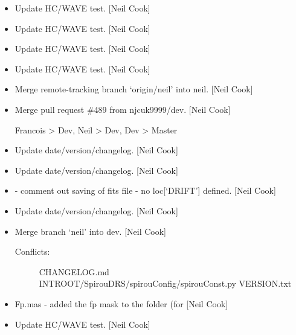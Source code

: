\documentclass[a4paper,10pt,english]{report}
\begin{document}
\begin{itemize}
\item {} 
Update HC/WAVE test. {[}Neil Cook{]}

\item {} 
Update HC/WAVE test. {[}Neil Cook{]}

\item {} 
Update HC/WAVE test. {[}Neil Cook{]}

\item {} 
Update HC/WAVE test. {[}Neil Cook{]}

\item {} 
Merge remote-tracking branch ‘origin/neil’ into neil. {[}Neil Cook{]}

\item {} 
Merge pull request \#489 from njcuk9999/dev. {[}Neil Cook{]}

Francois \textendash{}\textgreater{} Dev, Neil \textendash{}\textgreater{} Dev, Dev \textendash{}\textgreater{} Master

\item {} 
Update date/version/changelog. {[}Neil Cook{]}

\item {} 
Update date/version/changelog. {[}Neil Cook{]}

\item {} 
 - comment out saving of fits file - no
loc{[}‘DRIFT’{]} defined. {[}Neil Cook{]}

\item {} 
Update date/version/changelog. {[}Neil Cook{]}

\item {} 
Merge branch ‘neil’ into dev. {[}Neil Cook{]}
\begin{description}
\item[{Conflicts:}] \leavevmode
CHANGELOG.md
INTROOT/SpirouDRS/spirouConfig/spirouConst.py
VERSION.txt

\end{description}

\item {} 
Fp.mas - added the fp mask to the  folder (for 
{[}Neil Cook{]}

\item {} 
Update HC/WAVE test. {[}Neil Cook{]}

\end{itemize}
\end{document}
